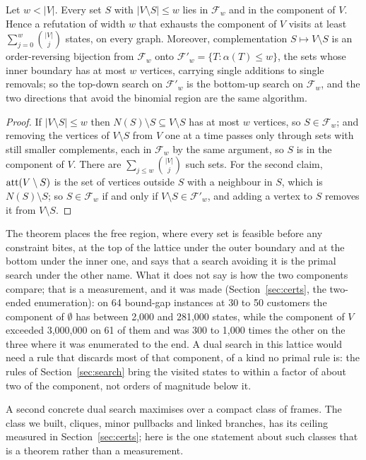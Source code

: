 \begin{theorem}\label{thm:dual-lattice}
Let $w<|V|$. Every set $S$ with $|V\setminus S|\le w$ lies in $\mathcal F_w$
and in the component of $V$. Hence a refutation of width $w$ that exhausts
the component of $V$ visits at least $\sum_{j=0}^{w}\binom{|V|}{j}$ states,
on every graph. Moreover, complementation $S\mapsto V\setminus S$ is an
order-reversing bijection from $\mathcal F_w$ onto
$\mathcal F'_w=\{T : \alpha(T)\le w\}$, the sets whose inner boundary has at
most $w$ vertices, carrying single additions to single removals; so the
top-down search on $\mathcal F'_w$ is the bottom-up search on
$\mathcal F_w$, and the two directions that avoid the binomial region are
the same algorithm.
\end{theorem}
\begin{proof}
If $|V\setminus S|\le w$ then $N(S)\setminus S\subseteq V\setminus S$ has at
most $w$ vertices, so $S\in\mathcal F_w$; and removing the vertices of
$V\setminus S$ from $V$ one at a time passes only through sets with still
smaller complements, each in $\mathcal F_w$ by the same argument, so $S$ is
in the component of $V$. There are $\sum_{j\le w}\binom{|V|}{j}$ such sets.
For the second claim, $\operatorname{att}(V\setminus S)$ is the set of vertices outside
$S$ with a neighbour in $S$, which is $N(S)\setminus S$; so
$S\in\mathcal F_w$ if and only if $V\setminus S\in\mathcal F'_w$, and adding
a vertex to $S$ removes it from $V\setminus S$.
\end{proof}

The theorem places the free region, where every set is feasible before any
constraint bites, at the top of the lattice under the outer boundary and at
the bottom under the inner one, and says that a search avoiding it is the
primal search under the other name. What it does not say is how the two
components compare; that is a measurement, and it was made
(Section~\ref{sec:certs}, the two-ended enumeration): on 64 bound-gap
instances at 30 to 50 customers the component of $\emptyset$ has between
2,000 and 281,000 states, while the component of $V$ exceeded 3,000,000 on
61 of them and was 300 to 1,000 times the other on the three where it was
enumerated to the end. A dual search in this lattice would need a rule that
discards most of that component, of a kind no primal rule is: the rules of
Section~\ref{sec:search} bring the visited states to within a factor of
about two of the component, not orders of magnitude below it.

A second concrete dual search maximises over a compact class of frames. The
class we built, cliques, minor pullbacks and linked branches, has its ceiling
measured in Section~\ref{sec:certs}; here is the one statement about such
classes that is a theorem rather than a measurement.


